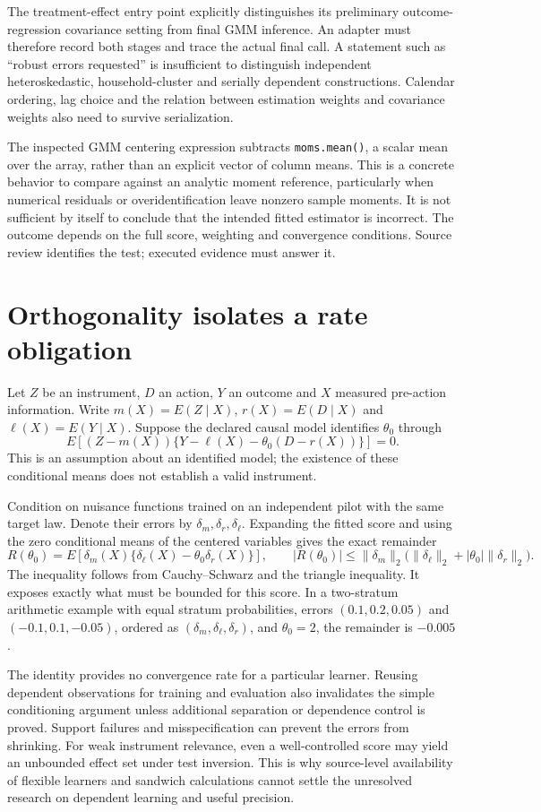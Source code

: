 The treatment-effect entry point explicitly distinguishes its preliminary
outcome-regression covariance setting from final GMM inference. An adapter must
therefore record both stages and trace the actual final call. A statement such
as ``robust errors requested'' is insufficient to distinguish independent
heteroskedastic, household-cluster and serially dependent constructions.
Calendar ordering, lag choice and the relation between estimation weights and
covariance weights also need to survive serialization.\cite{v13_sw_statsmodels,v131_sw_statsmodels}

The inspected GMM centering expression subtracts \texttt{moms.mean()}, a scalar
mean over the array, rather than an explicit vector of column means. This is
a concrete behavior to compare against an analytic moment reference, particularly
when numerical residuals or overidentification leave nonzero sample moments.
It is not sufficient by itself to conclude that the intended fitted estimator
is incorrect. The outcome depends on the full score, weighting and convergence
conditions. Source review identifies the test; executed evidence must answer it.
\cite{v131_sw_statsmodels}

\section{Orthogonality isolates a rate obligation}

Let $Z$ be an instrument, $D$ an action, $Y$ an outcome and $X$ measured
pre-action information. Write $m(X)=E(Z\mid X)$, $r(X)=E(D\mid X)$ and
$\ell(X)=E(Y\mid X)$. Suppose the declared causal model identifies $\theta_0$
through
\[
 E[(Z-m(X))\{Y-\ell(X)-\theta_0(D-r(X))\}]=0.
\]
This is an assumption about an identified model; the existence of these
conditional means does not establish a valid instrument.

Condition on nuisance functions trained on an independent pilot with the same
target law. Denote their errors by $\delta_m,\delta_r,\delta_\ell$. Expanding
the fitted score and using the zero conditional means of the centered variables
gives the exact remainder
\[
 R(\theta_0)
 =E[\delta_m(X)\{\delta_\ell(X)-\theta_0\delta_r(X)\}],
 \qquad
 |R(\theta_0)|\leq
 \|\delta_m\|_2\bigl(\|\delta_\ell\|_2+|\theta_0|\|\delta_r\|_2\bigr).
\]
The inequality follows from Cauchy--Schwarz and the triangle inequality. It
exposes exactly what must be bounded for this score. In a two-stratum arithmetic
example with equal stratum probabilities, errors $(0.1,0.2,0.05)$ and
$(-0.1,0.1,-0.05)$, ordered as $(\delta_m,\delta_\ell,\delta_r)$, and
$\theta_0=2$, the remainder is $-0.005$.\cite{v131_project_semantics}

The identity provides no convergence rate for a particular learner. Reusing
dependent observations for training and evaluation also invalidates the simple
conditioning argument unless additional separation or dependence control is
proved. Support failures and misspecification can prevent the errors from
shrinking. For weak instrument relevance, even a well-controlled score may
yield an unbounded effect set under test inversion. This is why source-level
availability of flexible learners and sandwich calculations cannot settle
the unresolved research on dependent learning and useful precision.
